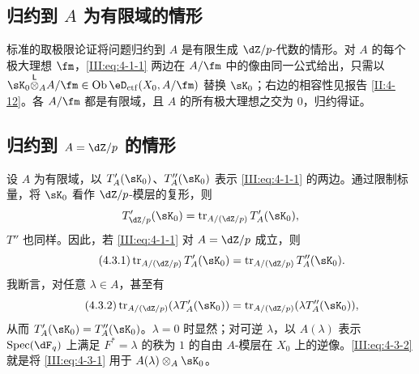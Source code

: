 \subsection{归约到 \texorpdfstring{$A$}{A} 为有限域的情形}\label{III:4-2}
标准的取极限论证将问题归约到 $A$ 是有限生成 $\dZ/p$-代数的情形。对 $A$ 的每个极大理想 $\fm$，\eqref{III:eq:4-1-1} 两边在 $A/\fm$ 中的像由同一公式给出，只需以 $\sK_0\lotimes_A A/\fm\in\ob\eD_{\mathrm{ctf}}(X_0,A/\fm)$ 替换 $\sK_0$；右边的相容性见报告 \ref{II:4-12}。各 $A/\fm$ 都是有限域，且 $A$ 的所有极大理想之交为 $0$，归约得证。

\subsection{归约到 \texorpdfstring{$A=\dZ/p$}{A=Z/p} 的情形}\label{III:4-3}
设 $A$ 为有限域，以 $T'_A(\sK_0)$、$T''_A(\sK_0)$ 表示 \eqref{III:eq:4-1-1} 的两边。通过限制标量，将 $\sK_0$ 看作 $\dZ/p$-模层的复形，则
\[T'_{\dZ/p}(\sK_0)=\tr_{A/(\dZ/p)}T'_A(\sK_0),\]
$T''$ 也同样。因此，若 \eqref{III:eq:4-1-1} 对 $A=\dZ/p$ 成立，则
\begin{equation*}\tag{4.3.1}\label{III:eq:4-3-1}
\tr_{A/(\dZ/p)}T'_A(\sK_0)=\tr_{A/(\dZ/p)}T''_A(\sK_0).
\end{equation*}
我断言，对任意 $\lambda\in A$，甚至有
\begin{equation*}\tag{4.3.2}\label{III:eq:4-3-2}
\tr_{A/(\dZ/p)}(\lambda T'_A(\sK_0))=\tr_{A/(\dZ/p)}(\lambda T''_A(\sK_0)),
\end{equation*}
从而 $T'_A(\sK_0)=T''_A(\sK_0)$。$\lambda=0$ 时显然；对可逆 $\lambda$，以 $A(\lambda)$ 表示 $\spec(\dF_q)$ 上满足 $F^*=\lambda$ 的秩为 $1$ 的自由 $A$-模层在 $X_0$ 上的逆像。\eqref{III:eq:4-3-2} 就是将 \eqref{III:eq:4-3-1} 用于 $A(\lambda)\otimes_A\sK_0$。

